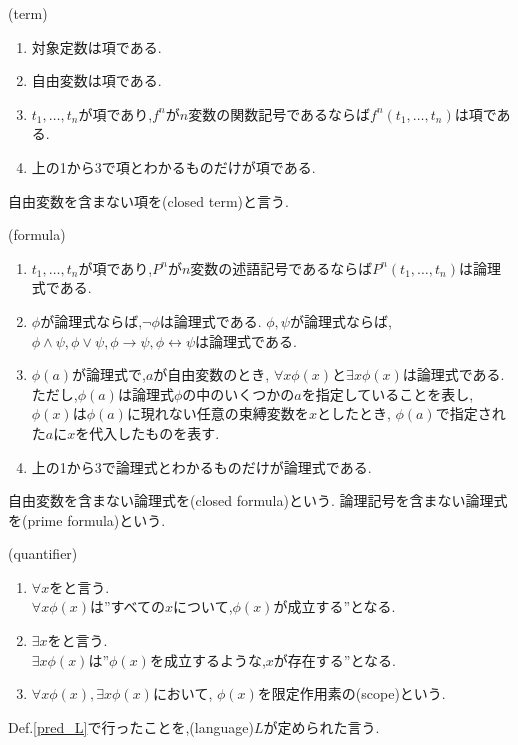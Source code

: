 \begin{dfn}
 (term)
 \begin{enumerate}
  \item 対象定数は項である.
  \item 自由変数は項である.
  \item $t_1,\dots,t_n$が項であり,$f^n$が$n$変数の関数記号であるならば$f^n(t_1,\dots,t_n)$は項である.
  \item 上の1から3で項とわかるものだけが項である.
 \end{enumerate}
\end{dfn}

自由変数を含まない項を(closed term)と言う.

\begin{dfn}
 (formula)
 \begin{enumerate}
  \item $t_1,\dots,t_n$が項であり,$P^n$が$n$変数の述語記号であるならば$P^n(t_1,\dots,t_n)$は論理式である.
  \item $\phi$が論理式ならば,$\lnot \phi$は論理式である. \newline
		$\phi,\psi$が論理式ならば, $\phi \land \psi, \phi \lor \psi, \phi \to \psi, \phi \leftrightarrow \psi$は論理式である.
  \item $\phi(a)$が論理式で,$a$が自由変数のとき, $\forall x \phi(x)$と$\exists x \phi(x)$は論理式である.
		ただし,$\phi(a)$は論理式$\phi$の中のいくつかの$a$を指定していることを表し,
		$\phi(x)$は$\phi(a)$に現れない任意の束縛変数を$x$としたとき, $\phi(a)$で指定された$a$に$x$を代入したものを表す.
  \item 上の1から3で論理式とわかるものだけが論理式である.
 \end{enumerate}
\end{dfn}

自由変数を含まない論理式を(closed formula)という.
論理記号を含まない論理式を(prime formula)という.

\begin{dfn}
 (quantifier)
 \begin{enumerate}
  \item $\forall x$をと言う.\\
		$\forall x \phi(x)$は''すべての$x$について,$\phi(x)$が成立する''となる.
  \item $\exists x$をと言う. \\
		$\exists x \phi(x)$は''$\phi(x)$を成立するような,$x$が存在する''となる.
  \item $\forall x \phi(x),\exists x \phi(x)$において,
		$\phi(x)$を限定作用素の(scope)という.
 \end{enumerate}
\end{dfn}

Def.\ref{pred_L}で行ったことを,(language)$L$が定められた言う.
